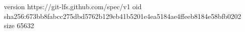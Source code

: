 version https://git-lfs.github.com/spec/v1
oid sha256:673bb8fabcc275dbd5762b129eb41b5201e4ea5184ae4ffeeb8184e58bfb0202
size 65632
